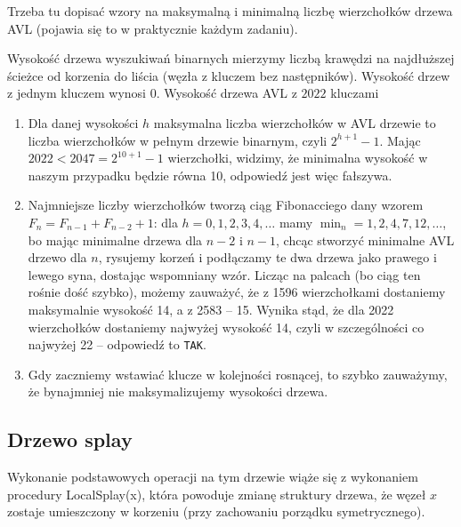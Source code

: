 \begin{editorsnote}
    Trzeba tu dopisać wzory na maksymalną i minimalną liczbę wierzchołków drzewa AVL (pojawia się to w praktycznie każdym zadaniu).
\end{editorsnote}

\begin{exam}
    Wysokość drzewa wyszukiwań binarnych mierzymy liczbą krawędzi na najdłuższej ścieżce od korzenia do liścia (węzła z kluczem bez następników). Wysokość drzew z jednym kluczem wynosi $0$. Wysokość drzewa AVL z $2022$ kluczami
    \bigskip

    \begin{enumerate}[\bf A.]
        \item Dla danej wysokości $h$ maksymalna liczba wierzchołków w AVL drzewie to liczba wierzchołków w pełnym drzewie binarnym, czyli $2^{h+1}-1$. Mając $2022<2047=2^{10+1}-1$ wierzchołki, widzimy, że minimalna wysokość w naszym przypadku będzie równa 10, odpowiedź jest więc fałszywa.

        \item Najmniejsze liczby wierzchołków tworzą ciąg Fibonacciego dany wzorem $F_{n}=F_{n-1}+F_{n-2}+1$: dla $h=0, 1, 2, 3, 4, \ldots$ mamy $\min_n=1,2,4,7,12,\ldots$, bo mając minimalne drzewa dla $n-2$ i $n-1$, chcąc stworzyć minimalne AVL drzewo dla $n$, rysujemy korzeń i podłączamy te dwa drzewa jako prawego i lewego syna, dostając wspomniany wzór. Licząc na palcach (bo ciąg ten rośnie dość szybko), możemy zauważyć, że z 1596 wierzchołkami dostaniemy maksymalnie wysokość 14, a z 2583 -- 15. Wynika stąd, że dla 2022 wierzchołków dostaniemy najwyżej wysokość 14, czyli w szczególności co najwyżej 22 -- odpowiedź to \texttt{TAK}.

        \item Gdy zaczniemy wstawiać klucze w kolejności rosnącej, to szybko zauważymy, że bynajmniej nie maksymalizujemy wysokości drzewa.
    \end{enumerate}
\end{exam}

\subsection{Drzewo splay}
Wykonanie podstawowych operacji na tym drzewie wiąże się z wykonaniem procedury {\ttfamily LocalSplay(x)}, 
która powoduje zmianę struktury drzewa, że węzeł $x$ zostaje umieszczony w korzeniu (przy zachowaniu porządku symetrycznego).

